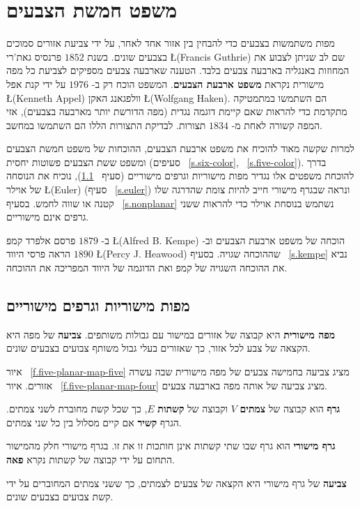 


\chapter{משפט חמשת הצבעים}
\label{c.five}

מפות משתמשות בצבעים כדי להבחין בין אזור אחד לאחר, על ידי צביעת אזורים סמוכים בצבעים שונים. בשנת
$1852$
פרנסיס גאת'רי
\L{(Francis Guthrie)}
שם לב שניתן לצבוע את המחוזות באנגליה בארבעה צבעים בלבד. הטענה שארבעה צבעים מספיקים לצביעת כל מפה מישורית נקראת 
\textbf{משפט ארבעת הצבעים}.
המשפט הוכח רק ב-%
$1976$
על ידי קנת אפל
\L{(Kenneth Appel)}
וולפגאנג האקן
\L{(Wolfgang Haken)}.
הם השתמשו במתמטיקה מתקדמת כדי להראות שאם קיימת דוגמה נגדית (מפה הדורשת יותר מארבעה בצבעים), אזי המפה קשורה לאחת מ-%
$1834$
תצורות. לבדיקת התצורות הללו הם השתמשו במחשב.

למרות שקשה מאוד להוכיח את משפט ארבעת הצבעים, ההוכחות של משפט חמשת הצבעים ומשפט ששת הצבעים פשוטות יחסית (סעיפים%
~\ref{s.six-color}, ~\ref{s.five-color}).
בדרך להוכחת משפטים אלו נגדיר מפות מישוריות וגרפים מישוריים (סעיף%
~\ref{s.planar}),
נוכיח את הנוסחה של אוילר 
\L{(Euler)}
(סעיף%
~\ref{s.euler})
ונראה שבגרף מישורי חייב להיות צומת שהדרגה שלו קטנה או שווה לחמש. בסעיף%
~\ref{s.nonplanar}
נשתמש בנוסחת אוילר
כדי להראות ששני גרפים אינם מישוריים.

ב-%
$1879$
פרסם אלפרד קמפ
\L{(Alfred B. Kempe)}
 הוכחה של משפט ארבעת הצבעים וב-%
$1890$
הראה פרסי היווד
\L{(Percy J. Heawood)}
 שההוכחה שגויה. בסעיף%
~\ref{s.kempe}
נביא את ההוכחה השגויה של  קמפ
ואת הדוגמה של
היווד המפריכה את ההוכחה.


\section{מפות מישוריות וגרפים מישוריים}\label{s.planar}

\begin{definition}
\textbf{מפה מישורית}
היא קבוצה של אזורים במישור עם גבולות משותפים.
\textbf{צביעה}
של מפה היא הקצאה של צבע לכל אזור, כך שאזורים בעלי גבול משותף צבועים בצבעים שונים.
\end{definition}
איור%
~\ref{f.five-planar-map-five}
מציג צביעה בחמישה צבעים של מפה מישורית שבה עשרה אזורים. איור%
~\ref{f.five-planar-map-four}
מציג צביעה של אותה מפה בארבעה צבעים. 
\begin{definition}
\textbf{גרף}
הוא קבוצה של 
\textbf{צמתים}
$V$
וקבוצה של 
\textbf{קשתות}
$E$,
כך שכל קשת מחוברת לשני צמתים. הגרף 
\textbf{קשיר}
אם קיים מסלול בין כל שני צמתים.

\textbf{גרף מישורי}
הוא גרף שבו שתי קשתות אינן חותכות זו את זו. בגרף מישורי חלק מהמישור התחום על ידי קבוצה של קשתות נקרא 
\textbf{פאה}.

\textbf{צביעה}
של גרף מישורי היא הקצאה של צבעים לצמתים, כך ששני צמתים המחוברים על ידי קשת צבועים בצבעים שונים.
\end{definition}



